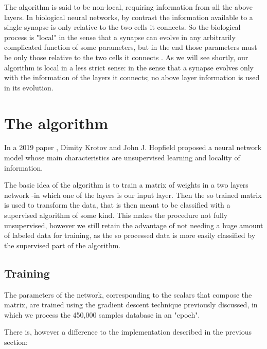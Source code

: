 \documentclass[a4paper]{report}
\begin{document}
The algorithm is said to be non-local, requiring information from all the above layers.
In biological neural networks, by contrast the information available to a single synapse is only relative to the two cells it connects.
So the biological process is "local" in the sense that a synapse can evolve in any arbitrarily complicated function of some parameters, but in the end those parameters must be only those relative to the two cells it connects  \cite{zhang2017split}.
As we will see shortly, our algorithm is local in a less strict sense: in the sense that a synapse evolves only with the information of the layers it connects; no above layer information is used in its evolution.

\section{The algorithm}
In a 2019 paper \cite{krotov2019unsupervised}, Dimity Krotov and John J. Hopfield proposed a neural network model whose main characteristics are unsupervised learning and locality of information.

The basic idea of the algorithm is to train a matrix of weights in a two layers network -in which one of the layers is our input layer.
Then the so trained matrix is used to transform the data, that is then meant to be classified with a supervised algorithm of some kind.
This makes the procedure not fully unsupervised, however we still retain the advantage of not needing a huge amount of labeled data for training, as the so processed data is more easily classified by the supervised part of the algorithm.

\subsection{Training}

The parameters of the network, corresponding to the scalars that compose the matrix, are trained using the gradient descent technique previously discussed, in which we process the 450,000 samples database in an "epoch".

There is, however a difference to the implementation described in the previous section:
\end{document}
